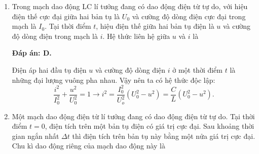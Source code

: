 \begin{enumerate}[label=\bfseries Câu \arabic*:]
{		
	}
	
	
	\item {}
	
	{Trong mạch dao động LC lí tưởng đang có dao động điện từ tự do, với hiệu điện thế cực đại giữa hai bản tụ là $U_0$ và cường độ dòng điện cực đại trong mạch là $I_0$. Tại thời điểm $t$, hiệu điện thế giữa hai bản tụ điện là $u$ và cường độ dòng điện trong mạch là $i$. Hệ thức liên hệ giữa $u$ và $i$ là
	}
	
	\hideall
	{		\textbf{Đáp án: D.}
		
		Điện áp hai đầu tụ điện $u$ và cường độ dòng điện $i$ ở một thời điểm $t$ là những đại lượng vuông pha nhau. Vậy nên ta có hệ thức độc lập:
		$$
		\dfrac{i^{2}}{I_{0}^{2}}+\dfrac{u^{2}}{U_{0}^{2}}=1 \rightarrow i^{2}=\dfrac{I_{0}^{2}}{U_{o}^{2}}\left(U_{0}^{2}-u^{2}\right)=\dfrac{C}{L}\left(U_{0}^{2}-u^{2}\right).
		$$
	}
	
	\item {}
	
	{Một mạch dao động điện từ lí tưởng đang có dao động điện từ tự do. Tại thời điểm $t = 0$, điện tích trên một bản tụ điện có giá trị cực đại. Sau khoảng thời gian ngắn nhất $\Delta t$ thì điện tích trên bản tụ này bằng một nửa giá trị cực đại. Chu kì dao động riêng của mạch dao động này là
	}
	

\end{enumerate}
